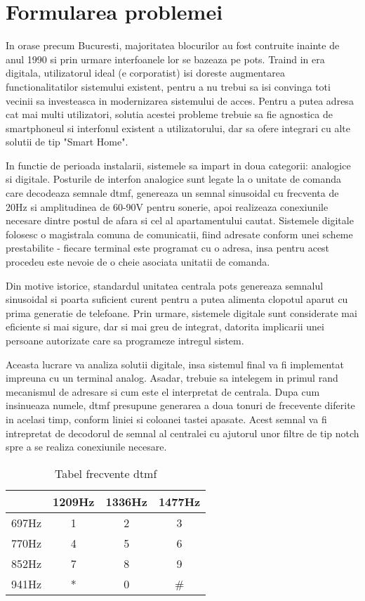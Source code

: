 \section {Formularea problemei}

In orase precum Bucuresti, majoritatea blocurilor au fost contruite inainte de anul 1990 si prin urmare interfoanele lor se bazeaza pe \acrshort{pots}. Traind in era digitala, utilizatorul ideal (e corporatist) isi doreste augmentarea functionalitatilor sistemului existent, pentru a nu trebui sa isi convinga toti vecinii sa investeasca in modernizarea sistemului de acces. Pentru a putea adresa cat mai multi utilizatori, solutia acestei probleme trebuie sa fie agnostica de smartphoneul si interfonul existent a utilizatorului, dar sa ofere integrari cu alte solutii de tip "Smart Home".

In functie de perioada instalarii, sistemele sa impart in doua categorii: analogice si digitale. Posturile de interfon analogice sunt legate la o unitate de comanda care decodeaza semnale \acrfull{dtmf}, genereaza un semnal sinusoidal cu frecventa de 20Hz si amplitudinea de 60-90V pentru sonerie, apoi realizeaza conexiunile necesare dintre postul de afara si cel al apartamentului cautat. Sistemele digitale folosesc o magistrala comuna de comunicatii, fiind adresate conform unei scheme prestabilite - fiecare terminal este programat cu o adresa, insa pentru acest procedeu este nevoie de o cheie asociata unitatii de comanda.

Din motive istorice, standardul unitatea centrala \acrshort{pots} genereaza semnalul sinusoidal si poarta suficient curent pentru a putea alimenta clopotul aparut cu prima generatie de telefoane. Prin urmare, sistemele digitale sunt considerate mai eficiente si mai sigure, dar si mai greu de integrat, datorita implicarii unei persoane autorizate care sa programeze intregul sistem.

Aceasta lucrare va analiza solutii digitale, insa sistemul final va fi implementat impreuna cu un terminal analog. Asadar, trebuie sa intelegem in primul rand mecanismul de adresare si cum este el interpretat de centrala. Dupa cum insinueaza numele, \acrshort{dtmf} presupune generarea a doua tonuri de frecevente diferite in acelasi timp, conform liniei si coloanei tastei apasate. Acest semnal va fi intrepretat de decodorul de semnal al centralei cu ajutorul unor filtre de tip notch spre a se realiza conexiunile necesare. 

\begin{table}[ht!]
\begin{tabular}{c||c|c|c}
 & 1209Hz & 1336Hz & 1477Hz \\
\hline
\hline
697Hz & 1 & 2 & 3 \\
\hline
770Hz & 4 & 5 & 6 \\
\hline
852Hz & 7 & 8 & 9 \\
\hline
941Hz & * & 0 & \# \\
\end{tabular}
\centering
\caption{Tabel frecvente \acrshort{dtmf}}
\label{tab:dtmf}
\end{table}

